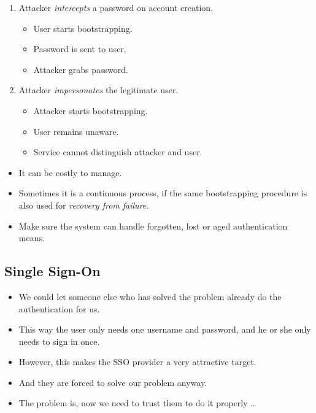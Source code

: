 \begin{frame}
  \begin{enumerate}
    \item Attacker \emph{intercepts} a password on account creation.
      \begin{itemize}
        \item User starts bootstrapping.
        \item Password is sent to user.
        \item Attacker grabs password.
      \end{itemize}

      \pause{}

    \item Attacker \emph{impersonates} the legitimate user.
      \begin{itemize}
        \item Attacker starts bootstrapping.
        \item User remains unaware.
        \item Service cannot distinguish attacker and user.
      \end{itemize}
  \end{enumerate}
\end{frame}

\begin{frame}
  \begin{itemize}
    \item It can be costly to manage.

    \item Sometimes it is a continuous process, if the same bootstrapping 
      procedure is also used for \emph{recovery from failure}.

    \item Make sure the system can handle forgotten, lost or aged 
      authentication means.

  \end{itemize}
\end{frame}

\subsection{Single Sign-On}

\begin{frame}
  \begin{itemize}
    \item We could let someone else who has solved the problem already do the 
      authentication for us.

    \item This way the user only needs one username and password, and he or she 
      only needs to sign in once.

    \item However, this makes the SSO provider a very attractive target.

    \item And they are forced to solve our problem anyway.

    \item The problem is, now we need to trust them to do it properly \dots
  \end{itemize}
\end{frame}

